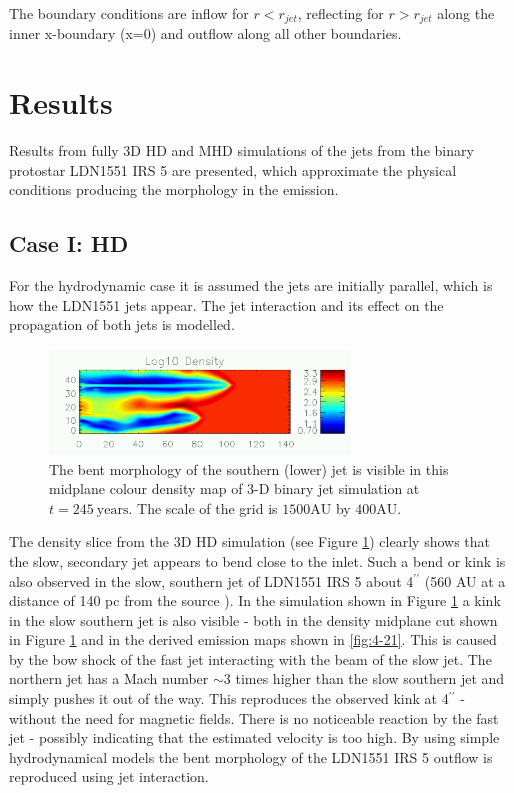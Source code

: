 The boundary conditions are inflow for $r<r_{jet}$, reflecting for $r>r_{jet}$ along the inner x-boundary (x=0) and outflow along all other boundaries. 
\section{Results}\label{Results}

Results from fully 3D HD and MHD simulations of the jets from the
binary protostar LDN1551 IRS 5 are presented, which approximate the physical conditions
producing the morphology in the emission.

\subsection{Case I: HD}
For the hydrodynamic case it is assumed the jets are initially
parallel, which is how the LDN1551 jets appear. The jet
interaction and its effect on the propagation of both jets is modelled.

\begin{figure}[t]
\centering
\includegraphics[width=8cm]{3d_slice}
\caption{ 
The bent morphology of the southern (lower) jet is visible in this midplane
colour density map of 3-D binary jet simulation at $t=245~\mathrm{years}$.
The scale of the grid is $1500 \mathrm{AU}$ by $400 \mathrm{AU}$.
}
\label{fig:4-5} 
\end{figure}

The density slice from the 3D HD simulation (see Figure  \ref{fig:4-5}) clearly shows that the slow, secondary jet appears to bend close to the inlet.
Such a bend or kink is also observed in the slow, southern jet of LDN1551 IRS 5 about 4$^{\prime\prime}$ (560 AU at a distance of 140 pc
from the source \citep{2000PASJ...52...81I}).
In the simulation shown in Figure \ref{fig:4-5} a kink in the slow southern jet
is also visible - both in the density midplane cut shown in Figure \ref{fig:4-5}
and in the derived emission maps shown in \ref{fig:4-21}. This is caused by 
the bow shock of the fast jet interacting with the beam of the slow jet.
The northern jet has a Mach number $\sim 3$ times higher
than the slow southern jet and simply pushes it out of the way.  This
reproduces the observed kink at 4$^{\prime\prime}$  - without the need for magnetic
fields.  There is no noticeable reaction by the fast jet - possibly
indicating that the estimated velocity is too high.
By using simple hydrodynamical models
the bent morphology of the LDN1551 IRS 5 outflow is reproduced using jet interaction.

